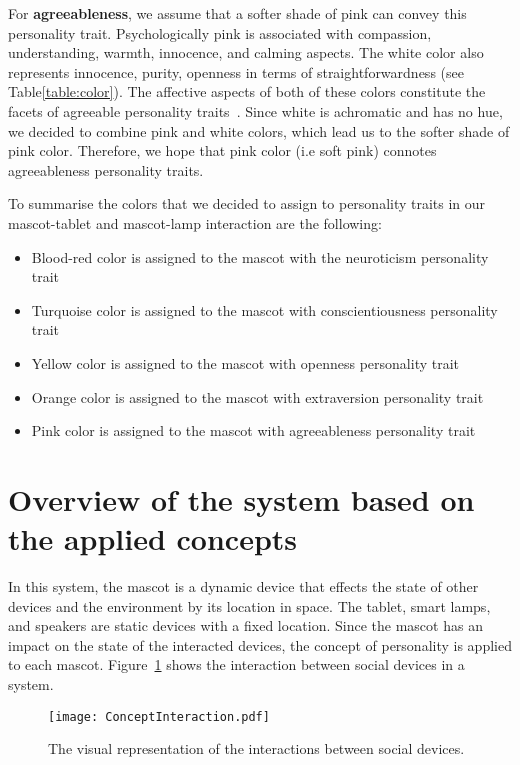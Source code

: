 For \textbf{agreeableness}, we assume that a softer shade of pink can convey this personality trait.
Psychologically pink is associated with compassion, understanding, warmth, innocence, and calming aspects.
The white color also represents innocence, purity, openness in terms of straightforwardness (see Table\ref{table:color}).
The affective aspects of both of these colors constitute the facets of
agreeable personality traits~\cite{costa1988catalog}.
Since white is achromatic and has no hue, we decided to combine
pink and white colors, which lead us to the softer shade of pink color.
Therefore, we hope that pink color (i.e soft pink) connotes agreeableness personality traits.

To summarise the colors that we decided to assign to personality traits in our
mascot-tablet and mascot-lamp interaction are the following:
\begin{itemize}
    \item Blood-red color is assigned to the mascot with the neuroticism personality trait
    \item Turquoise color is assigned to the mascot with conscientiousness personality trait
    \item Yellow color is assigned to the mascot with openness personality trait
    \item Orange color is assigned to the mascot with extraversion personality trait
    \item Pink color is assigned to the mascot with agreeableness personality trait
\end{itemize}


\section{Overview of the system based on the applied concepts}
\label{sec:overview-of-the-system-based-on-the-applied-concepts.}
In this system, the mascot is a dynamic device that effects the state of other
devices and the environment by its location in space.
The tablet, smart lamps, and speakers are static devices with a fixed location.
Since the mascot has an impact on the state of the interacted devices,
the concept of personality is applied to each mascot.
Figure~\ref{fig:ConceptInteraction} shows the interaction between social devices in a system.
\begin{figure}[hbt!]
    \centering
    \texttt{[image: ConceptInteraction.pdf]}
    \caption{The visual representation of the interactions between social devices.}
    \label{fig:ConceptInteraction}
\end{figure}

